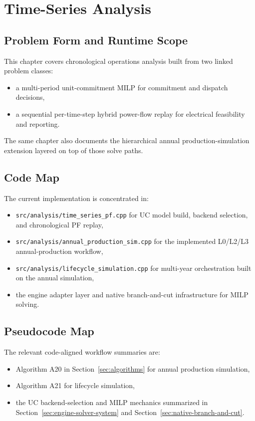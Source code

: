\section{Time-Series Analysis}
\label{sec:time-series}

\subsection{Problem Form and Runtime Scope}

This chapter covers chronological operations analysis built from two linked
problem classes:
\begin{itemize}
  \item a multi-period unit-commitment MILP for commitment and dispatch decisions,
  \item a sequential per-time-step hybrid power-flow replay for electrical feasibility and reporting.
\end{itemize}
The same chapter also documents the hierarchical annual production-simulation
extension layered on top of those solve paths.

\subsection{Code Map}

The current implementation is concentrated in:
\begin{itemize}
  \item \texttt{src/analysis/time\_series\_pf.cpp} for UC model build, backend selection, and chronological PF replay,
  \item \texttt{src/analysis/annual\_production\_sim.cpp} for the implemented L0/L2/L3 annual-production workflow,
  \item \texttt{src/analysis/lifecycle\_simulation.cpp} for multi-year orchestration built on the annual simulation,
  \item the engine adapter layer and native branch-and-cut infrastructure for MILP solving.
\end{itemize}

\subsection{Pseudocode Map}

The relevant code-aligned workflow summaries are:
\begin{itemize}
  \item Algorithm A20 in Section~\ref{sec:algorithms} for annual production simulation,
  \item Algorithm A21 for lifecycle simulation,
  \item the UC backend-selection and MILP mechanics summarized in Section~\ref{sec:engine-solver-system} and Section~\ref{sec:native-branch-and-cut}.
\end{itemize}

